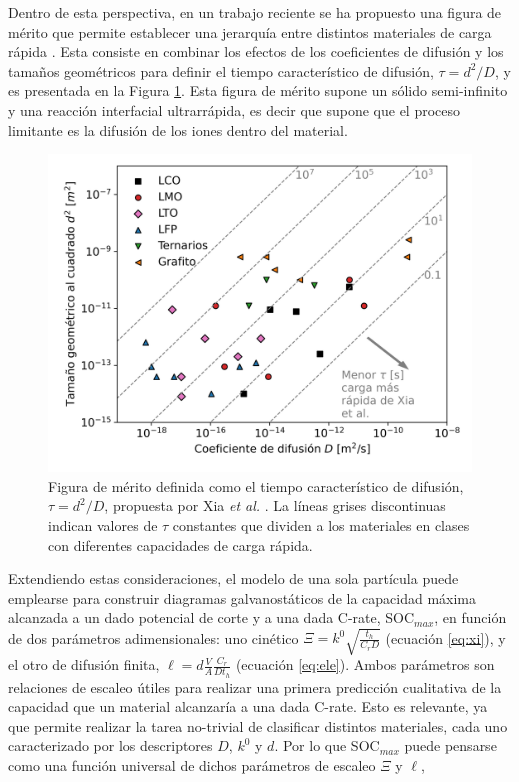 Dentro de esta perspectiva, en un trabajo reciente se ha propuesto una figura de mérito que permite establecer 
una jerarquía entre distintos materiales de carga rápida \cite{xia2022}. 
Esta consiste en combinar los efectos de los coeficientes de difusión y los 
tamaños geométricos para definir el tiempo característico de difusión, 
$\tau = d^2 / D$, y es presentada en la Figura \ref{fig:xiafom}. Esta figura de 
mérito supone un sólido semi-infinito y una reacción interfacial ultrarrápida, 
es decir que supone que el proceso limitante es la difusión de los iones dentro 
del material.
\begin{figure}[h!]
    \centering
    \includegraphics[width=.7\textwidth]{FastCharging/un/introduccion/xiafom.png}
    \caption{Figura de mérito definida como el tiempo característico de difusión, 
    $\tau = d^2/D$, propuesta por Xia \textit{et al.} \cite{xia2022}. La líneas
    grises discontinuas indican valores de $\tau$ constantes que dividen a los 
    materiales en clases con diferentes capacidades de carga rápida.}
    \label{fig:xiafom}
\end{figure}
Extendiendo estas consideraciones, el modelo de una sola partícula puede emplearse para construir
diagramas galvanostáticos de la capacidad máxima alcanzada a un dado potencial
de corte y a una dada C-rate, SOC$_{max}$, en función de dos parámetros 
adimensionales: uno cinético $\Xi = k^0 \sqrt{\frac{t_h}{C_r D}}$ (ecuación \ref{eq:xi}),
y el otro de difusión finita, $\ell = d \frac{V}{A} \frac{C_r}{D t_h}$
(ecuación \ref{eq:ele}). Ambos parámetros son relaciones de escaleo útiles
para realizar una primera predicción cualitativa de la capacidad que un 
material alcanzaría a una dada C-rate. Esto es relevante, ya que permite
realizar la tarea no-trivial de clasificar distintos materiales, cada uno 
caracterizado por los descriptores $D$, $k^0$ y $d$. Por lo que SOC$_{max}$
puede pensarse como una función universal de dichos parámetros de escaleo $\Xi$ y $\ell$,
